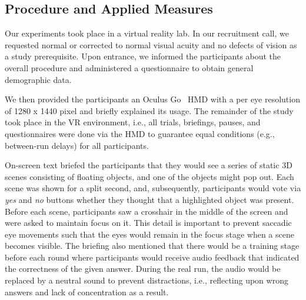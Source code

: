 \documentclass[journal]{vgtc}                %
\begin{document}
\subsection{Procedure and Applied Measures}



Our experiments took place in a virtual reality lab. In our recruitment call, we requested normal or corrected to normal visual acuity and no defects of vision as a study prerequisite. Upon entrance, we informed the participants about the overall procedure and administered a questionnaire to obtain general demographic data. 

We then provided the participants an Oculus Go~\cite{oculus} HMD with a per eye resolution of 1280 x 1440 pixel and briefly explained its usage. The remainder of the study took place in the VR environment, i.e., all trials, briefings, pauses, and questionnaires were done via the HMD to guarantee equal conditions (e.g., between-run delays) for all participants.


On-screen text briefed the participants that they would see a series of static 3D scenes consisting of floating objects, and one of the objects might pop out. Each scene was shown for a split second, and, subsequently, participants would vote via \textit{yes} and \textit{no} buttons whether they thought that a highlighted object was present. Before each scene, participants saw a crosshair in the middle of the screen and were asked to maintain focus on it. This detail is important to prevent saccadic eye movements such that the eyes would remain in the focus stage when a scene becomes visible. The briefing also mentioned that there would be a training stage before each round where participants would receive audio feedback that indicated the correctness of the given answer. During the real run, the audio would be replaced by a neutral sound to prevent distractions, i.e., reflecting upon wrong answers and lack of concentration as a result.
\end{document}
